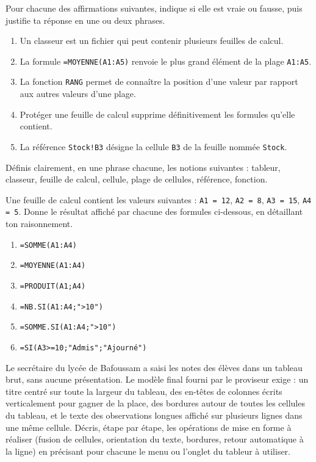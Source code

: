 \documentclass[11pt]{article}
\newcommand{\cle}[1]{{\popxbold\color{popdark}#1}}
\newcounter{popsec}
\newcounter{popsub}
\newcommand{\courssub}[1]{%
  \stepcounter{popsub}%
  \par\vspace{9pt}\noindent{\popxbold\fontsize{11.5}{13}\selectfont\color{popink}{\color{poporange}\thepopsec.\thepopsub}\hspace{6pt}#1}\par\nopagebreak\vspace{4pt}
}
\begin{document}
\begin{exercice}
Pour chacune des affirmations suivantes, indique si elle est vraie ou fausse, puis justifie ta réponse en une ou deux phrases.
\begin{enumerate}
\item Un classeur est un fichier qui peut contenir plusieurs feuilles de calcul.
\item La formule \texttt{=MOYENNE(A1:A5)} renvoie le plus grand élément de la plage \texttt{A1:A5}.
\item La fonction \texttt{RANG} permet de connaître la position d'une valeur par rapport aux autres valeurs d'une plage.
\item Protéger une feuille de calcul supprime définitivement les formules qu'elle contient.
\item La référence \texttt{Stock!B3} désigne la cellule \texttt{B3} de la feuille nommée \texttt{Stock}.
\end{enumerate}
\end{exercice}

\begin{exercice}[Définitions]
Définis clairement, en une phrase chacune, les notions suivantes : \cle{tableur}, \cle{classeur}, \cle{feuille de calcul}, \cle{cellule}, \cle{plage de cellules}, \cle{référence}, \cle{fonction}.
\end{exercice}

\begin{exercice}
Une feuille de calcul contient les valeurs suivantes : \texttt{A1 = 12}, \texttt{A2 = 8}, \texttt{A3 = 15}, \texttt{A4 = 5}. Donne le résultat affiché par chacune des formules ci-dessous, en détaillant ton raisonnement.
\begin{enumerate}
\item \texttt{=SOMME(A1:A4)}
\item \texttt{=MOYENNE(A1:A4)}
\item \texttt{=PRODUIT(A1;A4)}
\item \texttt{=NB.SI(A1:A4;">10")}
\item \texttt{=SOMME.SI(A1:A4;">10")}
\item \texttt{=SI(A3>=10;"Admis";"Ajourné")}
\end{enumerate}
\end{exercice}

\courssub{Je m'entraîne}

\begin{exercice}
Le secrétaire du lycée de Bafoussam a saisi les notes des élèves dans un tableau brut, sans aucune présentation. Le modèle final fourni par le proviseur exige : un titre centré sur toute la largeur du tableau, des en-têtes de colonnes écrits verticalement pour gagner de la place, des bordures autour de toutes les cellules du tableau, et le texte des observations longues affiché sur plusieurs lignes dans une même cellule. Décris, étape par étape, les opérations de mise en forme à réaliser (fusion de cellules, orientation du texte, bordures, retour automatique à la ligne) en précisant pour chacune le menu ou l'onglet du tableur à utiliser.
\end{exercice}
\end{document}
